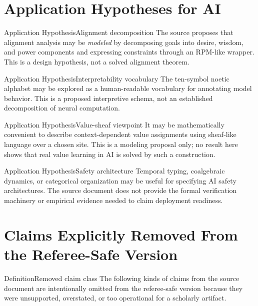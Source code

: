 \documentclass[11pt]{article}
\theoremstyle{plain}
\begin{document}
\section{Application Hypotheses for AI}

\begin{claimbox}{Application Hypothesis}{Alignment decomposition}
The source proposes that alignment analysis may be \emph{modeled} by decomposing
goals into desire, wisdom, and power components and expressing constraints
through an RPM-like wrapper. This is a design hypothesis, not a solved
alignment theorem.
\end{claimbox}

\begin{claimbox}{Application Hypothesis}{Interpretability vocabulary}
The ten-symbol noetic alphabet may be explored as a human-readable vocabulary
for annotating model behavior. This is a proposed interpretive schema, not an
established decomposition of neural computation.
\end{claimbox}

\begin{claimbox}{Application Hypothesis}{Value-sheaf viewpoint}
It may be mathematically convenient to describe context-dependent value
assignments using sheaf-like language over a chosen site. This is a modeling
proposal only; no result here shows that real value learning in AI is solved by
such a construction.
\end{claimbox}

\begin{claimbox}{Application Hypothesis}{Safety architecture}
Temporal typing, coalgebraic dynamics, or categorical organization may be useful
for specifying AI safety architectures. The source document does not provide the
formal verification machinery or empirical evidence needed to claim deployment
readiness.
\end{claimbox}

\section{Claims Explicitly Removed From the Referee-Safe Version}

\begin{claimbox}{Definition}{Removed claim class}
The following kinds of claims from the source document are intentionally omitted
from the referee-safe version because they were unsupported, overstated, or too
operational for a scholarly artifact.
\end{claimbox}
\end{document}
